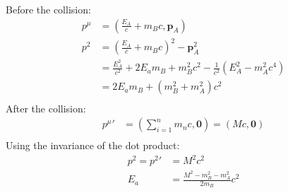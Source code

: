 \documentclass{article}
\begin{document}
Before the collision:
\begin{equation}
    \begin{split}
        p^{\mu} & = \left(\frac{E_A}{c} + m_Bc, \mathbf{p}_A\right) \\
        p^2 & = \left(\frac{E_A}{c} + m_Bc\right)^2 -  \mathbf{p}_A^2 \\
        & = \frac{E_A^2}{c^2} + 2E_am_B + m_B^2c^2 - \frac{1}{c^2}\left(E_A^2 - m_A^2c^4\right) \\
        & = 2E_am_B + \left(m_B^2 + m_A^2\right)c^2 \\
    \end{split}
\end{equation}
After the collision:
\begin{equation}
    \begin{split}
        {p^{\mu}}' & = \left(\sum_{i=1}^n m_nc, \mathbf{0}\right) = \left(Mc, \mathbf{0}\right) \\
    \end{split}
\end{equation}
Using the invariance of the dot product:
\begin{equation}
    \begin{split}
        p^2 = {p^2}' & = M^2c^2 \\
        E_a & = \frac{M^2 - m_B^2 - m_A^2}{2m_B}c^2
    \end{split}
\end{equation}
\clearpage
\end{document}
